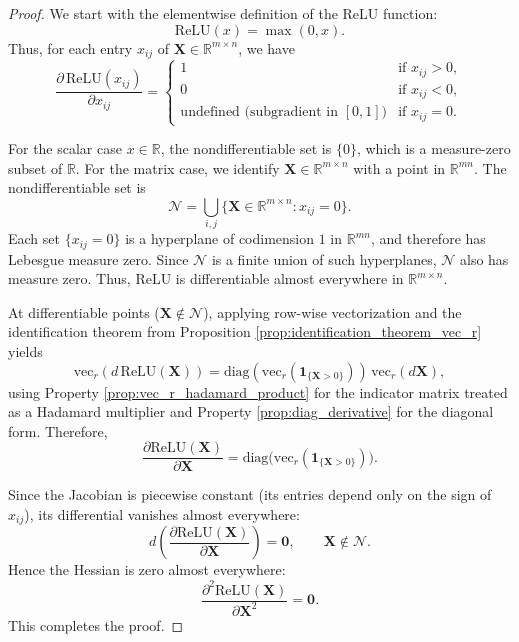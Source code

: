 \documentclass{article}
\begin{document}
\begin{proof}
We start with the elementwise definition of the ReLU function:
\[
\mathrm{ReLU}(x) = \max(0, x).
\]
Thus, for each entry $x_{ij}$ of $\mathbf{X} \in \mathbb{R}^{m \times n}$, we have
\[
\frac{\partial\, \mathrm{ReLU}(x_{ij})}{\partial x_{ij}} =
\begin{cases}
1 & \text{if } x_{ij} > 0, \\
0 & \text{if } x_{ij} < 0, \\
\text{undefined (subgradient in } [0,1]\text{)} & \text{if } x_{ij} = 0.
\end{cases}
\]

For the scalar case $x \in \mathbb{R}$, the nondifferentiable set is $\{0\}$, which is a measure-zero subset of $\mathbb{R}$.
For the matrix case, we identify $\mathbf{X} \in \mathbb{R}^{m \times n}$ with a point in $\mathbb{R}^{mn}$. The nondifferentiable set is
\[
\mathcal{N} = \bigcup_{i,j} \{ \mathbf{X} \in \mathbb{R}^{m \times n} : x_{ij} = 0 \}.
\]
Each set $\{x_{ij} = 0\}$ is a hyperplane of codimension $1$ in $\mathbb{R}^{mn}$, and therefore has Lebesgue measure zero. Since $\mathcal{N}$ is a finite union of such hyperplanes, $\mathcal{N}$ also has measure zero. Thus, $\mathrm{ReLU}$ is differentiable almost everywhere in $\mathbb{R}^{m \times n}$.

At differentiable points ($\mathbf{X} \notin \mathcal{N}$), applying row-wise vectorization and the identification theorem from Proposition \ref{prop:identification_theorem_vec_r} yields
\[
\mathrm{vec}_r(d\,\mathrm{ReLU}(\mathbf{X}))
= \mathrm{diag}(\mathrm{vec}_r(\mathbf{1}_{\{\mathbf{X}>0\}})) \, \mathrm{vec}_r(d\mathbf{X}),
\]
using Property \ref{prop:vec_r_hadamard_product} for the indicator matrix treated as a Hadamard multiplier and Property \ref{prop:diag_derivative} for the diagonal form.
Therefore,
\[
\frac{\partial \mathrm{ReLU}(\mathbf{X})}{\partial \mathbf{X}}
= \mathrm{diag}\!\big(\mathrm{vec}_r(\mathbf{1}_{\{\mathbf{X}>0\}})\big).
\]

Since the Jacobian is piecewise constant (its entries depend only on the sign of $x_{ij}$), its differential vanishes almost everywhere:
\[
d\left(\frac{\partial \mathrm{ReLU}(\mathbf{X})}{\partial \mathbf{X}}\right) = \mathbf{0}, \qquad \mathbf{X} \notin \mathcal{N}.
\]
Hence the Hessian is zero almost everywhere:
\[
\frac{\partial^2 \mathrm{ReLU}(\mathbf{X})}{\partial \mathbf{X}^2} = \mathbf{0}.
\]
This completes the proof.
\end{proof}
\end{document}
